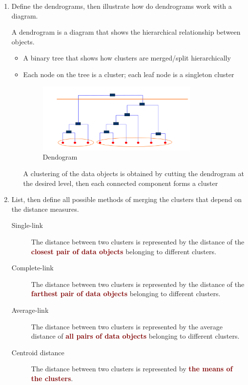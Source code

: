\documentclass[12pt]{article}
\newenvironment{QandA}{\begin{enumerate}[label=\bfseries\arabic*.]\bfseries}
{\end{enumerate}}
\newenvironment{answered}{\par\normalfont\color{Sepia}}{}
\begin{document}
\begin{QandA}
    \item Define the dendrograms, then illustrate how do dendrograms work with a diagram.
    \begin{answered}
        A dendrogram is a diagram that shows the hierarchical relationship
        between objects.
        \begin{itemize}
            \item A binary tree that shows how clusters are merged/split hierarchically
            \item Each node on the tree is a cluster; each leaf node is a singleton cluster
            \begin{figure}[h!]
                \centering
                \includegraphics[width=0.8\textwidth]{dendogram.png}
                \caption{Dendogram}
                \label{fig:dendogram}
            \end{figure}

            A clustering of the data objects is obtained by cutting the dendrogram
            at the desired level, then each connected component forms a cluster
        \end{itemize}
    \end{answered}

    \item List, then define all possible methods of merging the clusters that depend on the distance measures.
    \begin{answered}
        \begin{description}
            \item[Single-link] The distance between two clusters is represented by
                               the distance of the \textcolor{Maroon}{\textbf{closest pair of data objects}}
                               belonging to different clusters.
            \item[Complete-link] The distance between two clusters is represented by
                                 the distance of the \textcolor{Maroon}{\textbf{farthest pair of data objects}}
                                 belonging to different clusters.
            \item[Average-link] The distance between two clusters is represented by
                                the average distance of \textcolor{Maroon}{\textbf{all pairs of data objects}}
                                belonging to different clusters.
            \item[Centroid distance] The distance between two clusters is represented by
                                     \textcolor{Maroon}{\textbf{the means of the clusters}}.
        \end{description}
    \end{answered}


\end{QandA}
\end{document}
